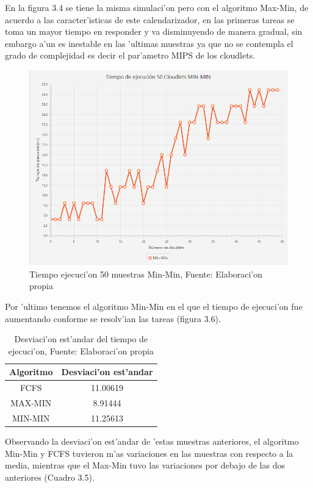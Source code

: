 \bigskip
 En la figura 3.4 se tiene la misma simulaci'on pero con el algoritmo Max-Min, de acuerdo a las caracter'isticas de este calendarizador, en las primeras tareas se toma un mayor tiempo en responder y va disminuyendo de manera gradual, sin embargo a'un es inestable en las 'ultimas muestras ya que no se contempla el grado de complejidad es decir el par'ametro MIPS de los cloudlets.

\begin{figure}
	\caption{Tiempo ejecuci'on 50 muestras Min-Min, Fuente: Elaboraci'on propia}
	\centering
	\includegraphics[scale=0.5]{media/min-min}
\end{figure}

\bigskip
Por 'ultimo tenemos el algoritmo Min-Min en el que el tiempo de ejecuci'on fue aumentando conforme se resolv'ian las tareas (figura 3.6).

\begin{table}[]
	\centering
	\caption{Desviaci'on est'andar del tiempo de ejecuci'on, Fuente: Elaboraci'on propia}
	\label{my-label}
	\begin{tabular}{@{}cc@{}}
		\toprule
		{\bf Algoritmo} & \multicolumn{1}{l}{{\bf Desviaci'on est'andar}} \\ \midrule
		FCFS & 11.00619 \\
		MAX-MIN & 8.91444 \\
		MIN-MIN & 11.25613 \\ \bottomrule
	\end{tabular}
\end{table}

Observando la desviaci'on est'andar de 'estas muestras anteriores, el algoritmo Min-Min y FCFS tuvieron m'as variaciones en las muestras con respecto a la media, mientras que el Max-Min tuvo las variaciones por debajo de las dos anteriores (Cuadro 3.5).